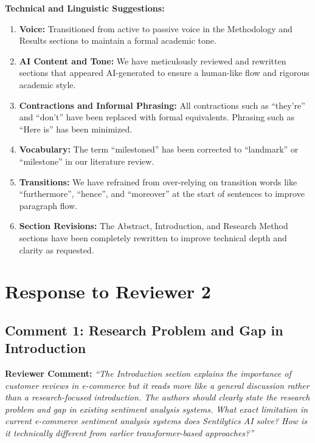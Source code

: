 \documentclass[11pt,a4paper]{article}
\begin{document}
\noindent \textbf{Technical and Linguistic Suggestions:}
\begin{enumerate}[leftmargin=*]
    \item \textbf{Voice:} Transitioned from active to passive voice in the Methodology and Results sections to maintain a formal academic tone.
    \item \textbf{AI Content and Tone:} We have meticulously reviewed and rewritten sections that appeared AI-generated to ensure a human-like flow and rigorous academic style.
    \item \textbf{Contractions and Informal Phrasing:} All contractions such as ``they're'' and ``don't'' have been replaced with formal equivalents. Phrasing such as ``Here is'' has been minimized.
    \item \textbf{Vocabulary:} The term ``milestoned'' has been corrected to ``landmark'' or ``milestone'' in our literature review.
    \item \textbf{Transitions:} We have refrained from over-relying on transition words like ``furthermore'', ``hence'', and ``moreover'' at the start of sentences to improve paragraph flow.
    \item \textbf{Section Revisions:} The Abstract, Introduction, and Research Method sections have been completely rewritten to improve technical depth and clarity as requested.
\end{enumerate}

\vspace{12pt}

\section*{Response to Reviewer 2}

\subsection*{Comment 1: Research Problem and Gap in Introduction}

\textbf{Reviewer Comment:} \textit{``The Introduction section explains the importance of customer reviews in e-commerce but it reads more like a general discussion rather than a research-focused introduction. The authors should clearly state the research problem and gap in existing sentiment analysis systems. What exact limitation in current e-commerce sentiment analysis systems does Sentilytics AI solve? How is it technically different from earlier transformer-based approaches?''}
\end{document}
